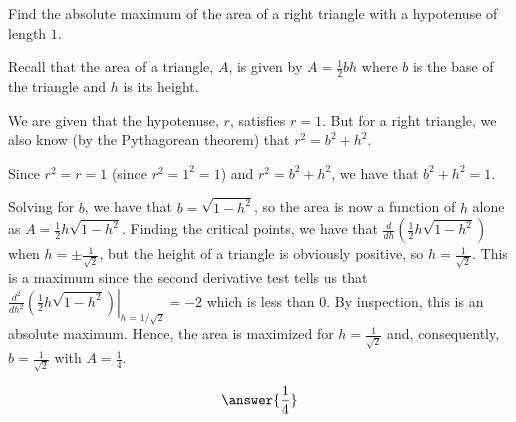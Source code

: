 \documentclass{ximera}
\author{Gregory Hartman \and Matthew Carr}
\begin{document}
\begin{exercise}



Find the absolute maximum of the area of a right triangle with a hypotenuse of length $1$. 
\begin{hint}
Recall that the area of a triangle, $A$, is given by $A=\frac{1}{2}bh$ where $b$ is the base of the triangle and $h$ is its height.
\end{hint}
\begin{hint}
We are given that the hypotenuse, $r$, satisfies $r=1$. But for a right triangle, we also know (by the Pythagorean theorem) that $r^2=b^2+h^2$.
\end{hint}
\begin{hint}
Since $r^2=r=1$ (since $r^2=1^2=1$) and $r^2=b^2+h^2$, we have that $b^2+h^2=1$. 
\end{hint}
\begin{hint}
Solving for $b$, we have that $b=\sqrt{1-h^2}$, so the area is now a function of $h$ alone as $A=\frac{1}{2}h\sqrt{1-h^2}$. Finding the critical points, we have that $\frac{d}{dh}(\frac{1}{2}h\sqrt{1-h^2})$ when $h=\pm\frac{1}{\sqrt{2}}$, but the height of a triangle is obviously positive, so $h=\frac{1}{\sqrt{2}}$. This is a maximum since the second derivative test tells us that $\left.\frac{d^2}{dh^2}(\frac{1}{2}h\sqrt{1-h^2})\right|_{h=1/\sqrt{2}}=-2$ which is less than $0$. By inspection, this is an absolute maximum. Hence, the area is maximized for $h=\frac{1}{\sqrt{2}}$ and, consequently, $b=\frac{1}{\sqrt{2}}$ with $A=\frac{1}{4}$.
\end{hint}
\begin{prompt}
\[\answer{\frac{1}{4}}\]
\end{prompt}
\end{exercise}
\end{document}
